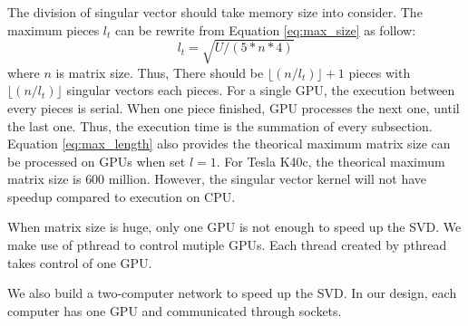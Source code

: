 The division of singular vector should take memory size into consider.
The maximum pieces $l_t$ can be rewrite from Equation \ref{eq:max_size} as follow:
\begin{equation}
l_t = \sqrt{U/(5 * n * 4)}
\label{eq:max_length}
\end{equation}
where $n$ is matrix size.
Thus, There should be $\lfloor(n/l_t)\rfloor+1$ pieces with $\lfloor(n/l_t)\rfloor$ singular vectors each pieces.
For a single GPU, the execution between every pieces is serial.
When one piece finished, GPU processes the next one, until the last one.
Thus, the execution time is the summation of every subsection.
Equation \ref{eq:max_length} also provides the theorical maximum matrix size can be processed on GPUs when set $l=1$.
For Tesla K40c, the theorical maximum matrix size is $600$ million.
However, the singular vector kernel will not have speedup compared to execution on CPU.

When matrix size is huge, only one GPU is not enough to speed up the SVD.
We make use of pthread to control mutiple GPUs.
Each thread created by pthread takes control of one GPU.

We also build a two-computer network to speed up the SVD.
In our design, each computer has one GPU and communicated through sockets.


